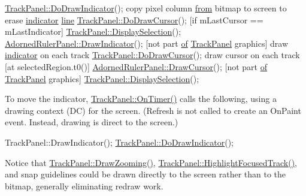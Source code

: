 \begin{DoxyCode}
\hyperlink{class_track_panel_a8ec4102237c8d4e852ef0f641712882d}{TrackPanel::DoDrawIndicator}();
        copy pixel column \hyperlink{nasm_8h_a5f350118b553429484632e5603292389}{from} bitmap to screen to erase \hyperlink{namespacewaflib_1_1_utils_a496439b70776ea74ef7305f1c411bf89}{indicator} 
      \hyperlink{seqread_8c_aad9ebcdde542d8b2075615388ff15a9c}{line}
        \hyperlink{class_track_panel_aff33f2fa5cda0ffb92a1dd41758e418c}{TrackPanel::DoDrawCursor}(); [\textcolor{keywordflow}{if} mLastCursor == mLastIndicator]
        \hyperlink{class_track_panel_a1a3b533d6302e7ad5da8b9bc82a0dd74}{TrackPanel::DisplaySelection}();
        \hyperlink{class_adorned_ruler_panel_a85f502d7af3de69507aeb394177c12f6}{AdornedRulerPanel::DrawIndicator}(); [not part 
      \hyperlink{rfft2d_test_m_l_8m_ad1fb8d92192e22cbe6298e4a2c65a711}{of} \hyperlink{class_track_panel}{TrackPanel} graphics]
        draw \hyperlink{namespacewaflib_1_1_utils_a496439b70776ea74ef7305f1c411bf89}{indicator} on each track
\hyperlink{class_track_panel_aff33f2fa5cda0ffb92a1dd41758e418c}{TrackPanel::DoDrawCursor}();
        draw cursor on each track  [at selectedRegion.t0()]
        \hyperlink{class_adorned_ruler_panel_a88db37689afaa4bf8311a9b79c6caf5d}{AdornedRulerPanel::DrawCursor}(); [not part 
      \hyperlink{rfft2d_test_m_l_8m_ad1fb8d92192e22cbe6298e4a2c65a711}{of} \hyperlink{class_track_panel}{TrackPanel} graphics]
        \hyperlink{class_track_panel_a1a3b533d6302e7ad5da8b9bc82a0dd74}{TrackPanel::DisplaySelection}();
\end{DoxyCode}


To move the indicator, \hyperlink{class_track_panel_a8cddb063467280ce559807d31493b67a}{Track\+Panel\+::\+On\+Timer()} calls the following, using a drawing context (DC) for the screen. (Refresh is not called to create an On\+Paint event. Instead, drawing is direct to the screen.) 
\begin{DoxyCode}
TrackPanel::DrawIndicator();
        \hyperlink{class_track_panel_a8ec4102237c8d4e852ef0f641712882d}{TrackPanel::DoDrawIndicator}();
\end{DoxyCode}


Notice that \hyperlink{class_track_panel_a53b862fc7f4eb461445429ad6b28a81e}{Track\+Panel\+::\+Draw\+Zooming()}, \hyperlink{class_track_panel_ab579d3634b223e60ceed553cd41f4791}{Track\+Panel\+::\+Highlight\+Focused\+Track()}, and snap guidelines could be drawn directly to the screen rather than to the bitmap, generally eliminating redraw work.

